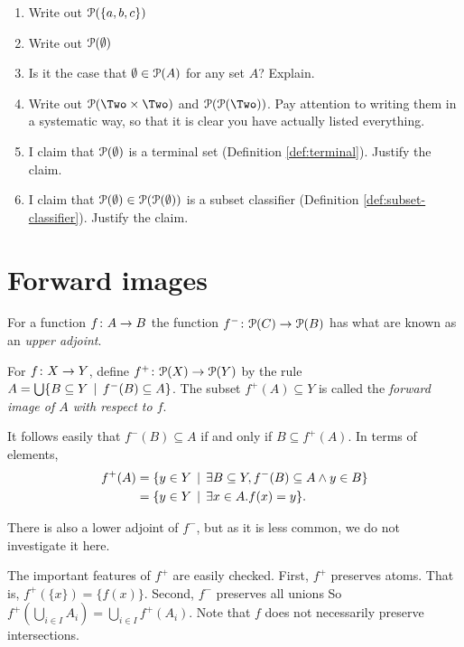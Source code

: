 \begin{exercises}
	\begin{enumerate}
		\item Write out ${\mathcal{P}}(\{a,b,c\})$
		\item Write out ${\mathcal{P}}(\emptyset)$
		\item Is it the case that $\emptyset \in {\mathcal{P}}(A)$ for any set $A$? Explain. 
		\item Write out $\powerset(\Two\times \Two)$ and $\powerset(\powerset(\Two))$. Pay attention to writing them in a systematic way, so that it is clear you have actually listed everything.
		\item I claim that ${\mathcal{P}}(\emptyset)$ is a terminal set (Definition \ref{def:terminal}). Justify the claim.
		\item I claim that ${\mathcal{P}}(\emptyset)\in {\mathcal{P}}({\mathcal{P}}(\emptyset))$ is a subset classifier (Definition \ref{def:subset-classifier}). Justify the claim.
	\end{enumerate}
\end{exercises}

\section{Forward images}

For a function ${f}\colon{A}\to{B}$ the function ${f^-}\colon{{\mathcal{P}}(C)}\to{{\mathcal{P}}(B)}$ has what are known as an \emph{upper adjoint}. 

\begin{defn}
	For ${f}\colon{X}\to{Y}$, define ${f^+}\colon{{\mathcal{P}}(X)}\to{{\mathcal{P}}(Y)}$ by the rule $A= \bigcup\{B\subseteq Y\,\mid\, f^-(B)\subseteq A\}$. The subset 
	$f^+(A)\subseteq Y$ is called the \emph{forward image of $A$ with respect to $f$}.
\end{defn}

It follows easily that $f^-(B)\subseteq A$ if and only if $B\subseteq f^+(A)$.
In terms of elements, 
\begin{align*}
f^+(A) &= \{y\in Y\,\mid\, \exists B\subseteq Y, f^-(B)\subseteq A \wedge y\in B\}\\
       &= \{y\in Y\,\mid\, \exists x\in A.f(x)=y\}.
\end{align*}

There is also a lower adjoint of $f^-$, but as it is less common, we do not investigate it here.

The important features of $f^+$ are easily checked. First, $f^+$ preserves atoms.
That is, $f^+(\{x\}) = \{f(x)\}$. 
Second, $f^-$ preserves all unions So $f^+(\bigcup_{i\in I}A_i) = \bigcup_{i\in I}f^+(A_i)$. Note that $f$ does not necessarily preserve intersections.


